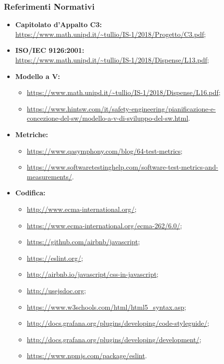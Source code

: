 \subsubsection{Referimenti Normativi}
\begin{itemize}
\item \textbf{Capitolato d'Appalto C3:}\\ \url{https://www.math.unipd.it/~tullio/IS-1/2018/Progetto/C3.pdf};
\item \textbf{ISO/IEC 9126:2001:}\\ \url{https://www.math.unipd.it/~tullio/IS-1/2018/Dispense/L13.pdf};
\item \textbf{Modello a V:}
\begin{itemize}
	\item \url{https://www.math.unipd.it/~tullio/IS-1/2018/Dispense/L16.pdf};
	\item \url{https://www.hintsw.com/it/safety-engineering/pianificazione-e-concezione-del-sw/modello-a-v-di-sviluppo-del-sw.html}.
\end{itemize}
\item \textbf{Metriche:}
	\begin{itemize}
	\item \url{https://www.qasymphony.com/blog/64-test-metrics};
	\item \url{https://www.softwaretestinghelp.com/software-test-metrics-and-measurements/}.
	\end{itemize}
\item \textbf{Codifica:}
	\begin{itemize}
	\item \url{http://www.ecma-international.org/};
	\item \url{https://www.ecma-international.org/ecma-262/6.0/};
	\item \url{https://github.com/airbnb/javascript};
	\item \url{https://eslint.org/};
	\item \url{http://airbnb.io/javascript/css-in-javascript};
	\item \url{http://usejsdoc.org};
	\item \url{https://www.w3schools.com/html/html5_syntax.asp};
	\item \url{http://docs.grafana.org/plugins/developing/code-styleguide/};
	\item \url{http://docs.grafana.org/plugins/developing/development/};
	\item \url{https://www.npmjs.com/package/eslint}.
	\end{itemize}

\end{itemize}
